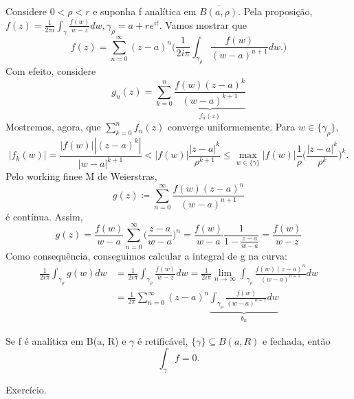 \documentclass[ComplexAnalysis/complex.tex]{subfiles}
\begin{document}
\begin{proof*}
	Considere $0<\rho<r$ e suponha f analítica em $\overline{B(a, \rho)}$. Pela proposição, $f(z) =\displaystyle \frac{1}{2\pi i}\int_{\gamma}^{}\frac{f(w)}{w-z}dw,
		\gamma_{\rho} = a + r e^{it}.$ Vamos mostrar que
	$$
		f(z) = \sum\limits_{n=0}^{\infty}(z-a)^n\biggl(\frac{1}{2i \pi}\int_{\gamma_{\rho}}^{}\frac{f(w)}{(w-a)^{n+1}}dw.\biggr)
	$$
	Com efeito, considere
	$$
		g_{n}(z) = \sum\limits_{k=0}^{n}\underbrace{\frac{f(w)(z-a)^{k}}{(w-a)^{k+1}}}_{f_{n}(z)}
	$$
	Mostremos, agora, que $\sum\limits_{k=0}^{n}f_{n}(z)$ converge uniformemente. Para $w\in{\{\gamma_{\rho}\}},$
	$$
		|f_{k}(w)| = \frac{|f(w)||(z-a)^{k}|}{|w-a|^{k+1}} < |f(w)|\frac{|z-a|^{k}}{\rho^{k+1}}\leq \max_{w\in \{\gamma\}}|f(w)|\frac{1}{\rho}\biggl(\frac{|z-a|^k}{\rho^k}\biggr)^{k}.
	$$
	Pelo working finee M de Weierstras,
	$$
		g(z)\coloneqq \sum\limits_{n=0}^{\infty}\frac{f(w)(z-a)^{n}}{(w-a)^{n+1}}
	$$
	é contínua. Assim,
	$$
		g(z) = \frac{f(w)}{w - a}\sum\limits_{n=0}^{\infty}\biggl(\frac{z-a}{w-a}\biggr)^{n} = \frac{f(w)}{w-a}\frac{1}{1-\frac{z-a}{w-a}} = \frac{f(w)}{w-z}
	$$
	Como consequência, conseguimos calcular a integral de g na curva:
	\begin{align*}
		\frac{1}{2i \pi}\int_{\gamma_{\rho}}^{}g(w)dw & = \frac{1}{2i \pi}\int_{\gamma_{\rho}}^{}\frac{f(w)}{w-z}dw = \frac{1}{2i \pi}\lim_{n\to\infty}\int_{\gamma_{\rho}}\frac{f(w)(z-a)^{n}}{(w-a)^{n+1}}dw \\
		                                              & = \frac{1}{2\pi}\sum\limits_{n=0}^{\infty}(z-a)^{n}\underbrace{\int_{\gamma_{\rho}}^{}\frac{f(w)}{(w-a)^{n+1}}dw}_{b_{n}}
	\end{align*}
\end{proof*}
\begin{crl*}
	Se f é analítica em B(a, R) e $\gamma$ é retificável, $\{\gamma\}\subseteq{B(a, R)}$ e fechada, então
	$$
		\int_{\gamma}^{}f = 0.
	$$
\end{crl*}
\begin{proof*}
	Exercício.
\end{proof*}
\end{document}
